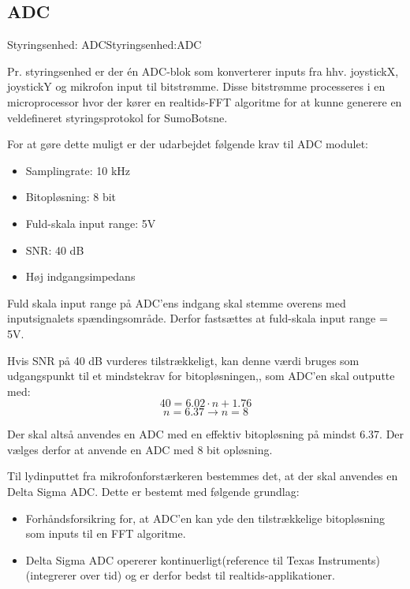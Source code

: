 {\subsection{ADC}

\begin{PartBlokDescription}{Styringsenhed: ADC}{Styringsenhed:ADC}
\end{PartBlokDescription}


Pr. styringsenhed er der én ADC-blok som konverterer inputs fra hhv. joystickX, joystickY og mikrofon input til bitstrømme. Disse bitstrømme processeres i en microprocessor hvor der kører en realtids-FFT algoritme for at kunne generere en veldefineret styringsprotokol for SumoBotsne. 

For at gøre dette muligt er der udarbejdet følgende krav til ADC modulet:
\begin{itemize}
    \item Samplingrate: 10 kHz
    \item Bitopløsning: 8 bit
    \item Fuld-skala input range: 5V
    \item SNR: 40 dB
    \item Høj indgangsimpedans
\end{itemize}

Fuld skala input range på ADC'ens indgang skal stemme overens med inputsignalets spændingsområde.
Derfor fastsættes at fuld-skala input range = 5V.

\tbr Hvis SNR på 40 dB vurderes tilstrækkeligt, kan denne værdi bruges som udgangspunkt til et mindstekrav for bitopløsningen,\cite{KesterMT-001Care}, som ADC'en skal outputte med:
\[ 40 = 6.02 \cdot n+1.76 \]
\[ n = 6.37 \to n = 8 \]

Der skal altså anvendes en ADC med en effektiv bitopløsning på mindst 6.37. Der vælges derfor at anvende en ADC med 8 bit opløsning. 

Til lydinputtet fra mikrofonforstærkeren bestemmes det, at der skal anvendes en Delta Sigma ADC. Dette er bestemt med følgende grundlag:
\begin{itemize}
    \item Forhåndsforsikring for, at ADC'en kan yde den tilstrækkelige bitopløsning som inputs til en FFT algoritme. 
    \item Delta Sigma ADC opererer kontinuerligt(\tbr reference til Texas Instruments) (integrerer over tid) og er derfor bedst til realtids-applikationer.  
\end{itemize}

}
